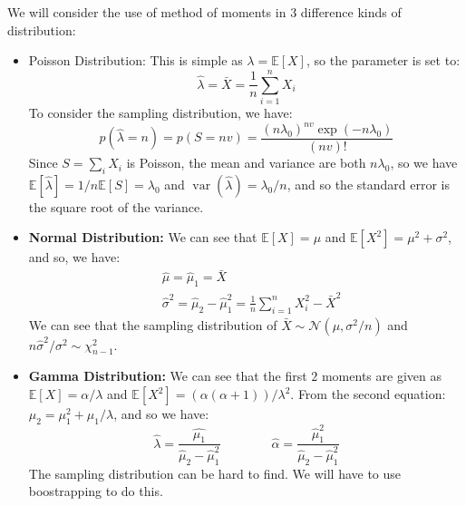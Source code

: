 \begin{example}
    We will consider the use of method of moments in $3$ difference kinds of distribution:
    \begin{itemize}
        \item Poisson Distribution: This is simple as $\lambda = \mathbb{E}[X]$, so the parameter is set to:
        \begin{equation*}
            \hat{\lambda} = \bar{X} = \frac{1}{n}\sum^n_{i=1} X_i
        \end{equation*}
        To consider the sampling distribution, we have:
        \begin{equation*}
            p(\hat{\lambda} = n) = p(S = nv) = \frac{(n\lambda_0)^{nv}\exp(-n\lambda_0)}{(nv)!}
        \end{equation*}
        Since $S = \sum_iX_i$ is Poisson, the mean and variance are both $n\lambda_0$, so we have $\mathbb{E}[\hat{\lambda}] = 1/n \mathbb{E}[S] = \lambda_0$ and $\operatorname{var}(\hat{\lambda}) = \lambda_0/n$, and so the standard error is the square root of the variance.
        \item \textbf{Normal Distribution:} We can see that $\mathbb{E}[X] = \mu$ and $\mathbb{E}[X^2] = \mu^2 + \sigma^2$, and so, we have:
        \begin{equation*}
        \begin{aligned}
            &\hat{\mu} = \hat{\mu}_1 = \bar{X} \\
            &\hat{\sigma}^2 = \hat{\mu}_2 - \hat{\mu}_1^2 = \frac{1}{n}\sum^n_{i=1}X_i^2 - \bar{X}^2 
        \end{aligned}
        \end{equation*}
        We can see that the sampling distribution of $\bar{X}\sim\mathcal{N}(\mu, \sigma^2/n)$ and $n\hat{\sigma}^2/\sigma^2\sim\chi^2_{n-1}$. 
        \item \textbf{Gamma Distribution:} We can see that the first $2$ moments are given as $\mathbb{E}[X] = \alpha/\lambda$ and $\mathbb{E}[X^2] = (\alpha(\alpha + 1))/\lambda^2$. From the second equation: $\mu_2 = \mu_1^2 + \mu_1/\lambda$, and so we have:
        \begin{equation*}
            \hat{\lambda} = \frac{\hat{\mu_1}}{\hat{\mu}_2 - \hat{\mu}_1^2} \qquad\qquad \hat{\alpha} = \frac{\hat{\mu}_1^2}{\hat{\mu}_2 - \hat{\mu}_1^2} 
        \end{equation*}
        The sampling distribution can be hard to find. We will have to use boostrapping to do this. 
    \end{itemize}
\end{example}

